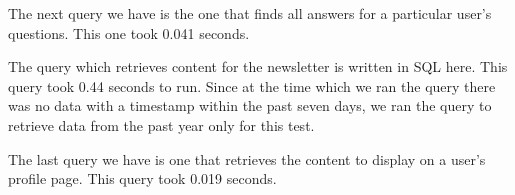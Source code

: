 
The next query we have is the one that finds all answers for a particular user's questions. This one took 0.041 seconds.


The query which retrieves content for the newsletter is written in SQL here. This query took 0.44 seconds to run. Since at the time which we ran the query there was no data with a timestamp within the past seven days, we ran the query to retrieve data from the past year only for this test.


The last query we have is one that retrieves the content to display on a user's profile page. This query took 0.019 seconds.

